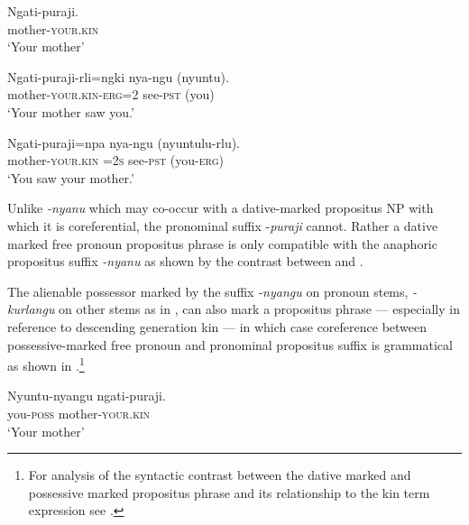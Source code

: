 \documentclass[output=paper]{../langscibook}
\begin{document}
\ea%
    \label{ex:laughren:31}
\ea
\label{ex:laughren:31a}
\gll  Ngati-puraji. \\
    mother-\textsc{your.kin}\\
\glt `Your mother'

\ex
\label{ex:laughren:31b}
\gll  Ngati-puraji-rli=ngki  nya-ngu  (nyuntu).\\
    mother-\textsc{your.kin}{}-\textsc{erg=2}  see-\textsc{pst}  (you)\\
\glt `Your mother saw you.'

\ex
\label{ex:laughren:31c}
\gll Ngati-puraji=npa  nya-ngu {(nyuntulu-rlu).}\\
    mother-\textsc{your.kin} \textsc{=2s} see-\textsc{pst}  (you-\textsc{erg)}\\
\glt `You saw your mother.'
\z
\z


Unlike \textit{{}-nyanu} which may co-occur with a dative-marked propositus NP with which it is coreferential, the pronominal suffix -\textit{puraji} cannot. Rather a dative marked free pronoun propositus phrase is only compatible with the anaphoric propositus suffix \textit{{}-nyanu} as shown by the contrast between  and .

\ea%
    \label{ex:laughren:32}

\z
\z

The alienable possessor marked by the suffix \textit{-nyangu} on pronoun stems, \textit{{}-kurlangu} on other stems as in , can also mark a propositus phrase — especially in reference to descending generation kin — in which case coreference between possessive-marked free pronoun and pronominal propositus suffix is grammatical as shown in .\footnote{For analysis of the syntactic contrast between the dative marked and possessive marked propositus phrase and its relationship to the kin term expression see \citet{Laughren2016}.}

\ea%
\label{ex:laughren:33}
\gll Nyuntu-nyangu ngati-puraji.\\
you-\textsc{poss} mother-\textsc{your.kin}\\
\glt `Your mother'
\end{document}
